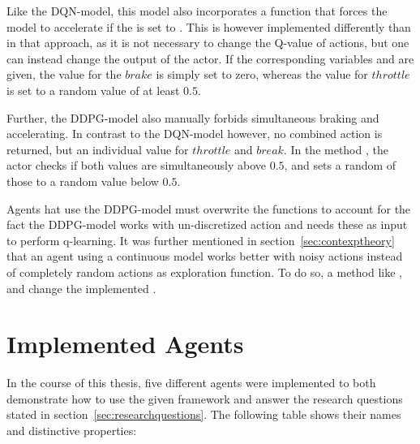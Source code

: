 Like the DQN-model, this model also incorporates a function that forces the model to accelerate if the  is set to . This is however implemented differently than in that approach, as it is not necessary to change the Q-value of actions, but one can instead change the output of the actor. If the corresponding variables  and  are given, the value for the $brake$ is simply set to zero, whereas the value for $throttle$ is set to a random value of at least $0.5$. 

Further, the DDPG-model also manually forbids simultaneous braking and accelerating. In contrast to the DQN-model however, no combined action is returned, but an individual value for $throttle$ and $break$. In the method , the actor checks if both values are simultaneously above $0.5$, and sets a random of those to a random value below $0.5$.

Agents hat use the DDPG-model must overwrite the functions  to account for the fact the DDPG-model works with un-discretized action and needs these as input to perform q-learning. 
It was further mentioned in section~\ref{sec:contexptheory} that an agent using a continuous model works better with noisy actions instead of completely random actions as exploration function. To do so, a method like , and change the implemented .

\section{Implemented Agents}

In the course of this thesis, five different agents were implemented to both demonstrate how to use the given framework and answer the research questions stated in section~\ref{sec:researchquestions}.  The following table shows their names and distinctive properties: 

